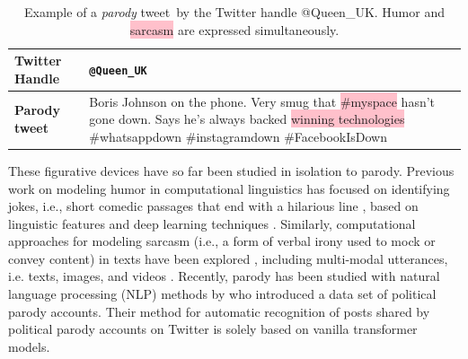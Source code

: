 \documentclass[11pt]{article}
\begin{document}
\renewcommand{\arraystretch}{1.0}
\begin{table}[!t]
    \footnotesize
    \centering
    \begin{tabular}{|m{1.5cm}|m{5cm}|}
        \hline
        \rowcolor[gray]{.7} \textbf{Twitter Handle} & %
        \texttt{@Queen\_UK} \\
        \hline
        \textbf{Parody tweet} &  Boris Johnson on the phone. Very smug that \colorbox{pink}{\#myspace} hasn't gone down. Says he's always backed \colorbox{pink}{winning technologies} \#whatsappdown \#instagramdown \#FacebookIsDown \\
        \hline
    \end{tabular}
    \caption{Example of a \emph{parody} tweet\protect\footnotemark\ by the Twitter handle @Queen\_UK. Humor and \colorbox{pink}{sarcasm} are expressed simultaneously.}
   \label{tab:tweet}
\end{table}


These figurative devices have so far been studied in isolation to parody.
Previous work on modeling humor in computational linguistics has focused on identifying jokes, i.e., short comedic passages that end with a hilarious line \citep{hetzron1991structure}, based on linguistic features \citep{1400851,purandare-litman-2006-humor,kiddon-brun-2011-thats} and deep learning techniques \citep{chen-soo-2018-humor,weller-seppi-2019-humor,annamoradnejad2020colbert}.
Similarly, computational approaches for modeling sarcasm (i.e., a form of verbal irony used to mock or convey content) in texts have been explored \citep{davidov-etal-2010-semi,gonzalez-ibanez-etal-2011-identifying,liebrecht-etal-2013-perfect,Rajadesingan2015SarcasmDO,ghosh-etal-2020-interpreting,ghosh-etal-2021-laughing}, including multi-modal utterances, i.e. texts, images, and videos \citep{cai-etal-2019-multi,castro-etal-2019-towards,oprea-magdy-2020-isarcasm}.
Recently, parody has been studied with natural language processing (NLP) methods by \citet{maronikolakis-etal-2020-analyzing} who introduced a data set of political parody accounts.
Their method for automatic recognition of posts shared by political parody accounts on Twitter is solely based on vanilla transformer models.
\end{document}
